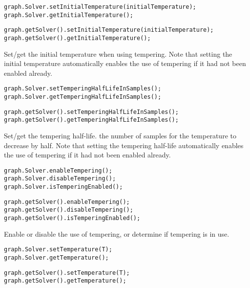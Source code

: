 \ifmatlab
\begin{lstlisting}
graph.Solver.setInitialTemperature(initialTemperature);
graph.Solver.getInitialTemperature();
\end{lstlisting}
\fi

\ifjava
\begin{lstlisting}
graph.getSolver().setInitialTemperature(initialTemperature);
graph.getSolver().getInitialTemperature();
\end{lstlisting}
\fi

Set/get the initial temperature when using tempering. Note that setting the initial temperature automatically enables the use of tempering if it had not been enabled already.

\ifmatlab
\begin{lstlisting}
graph.Solver.setTemperingHalfLifeInSamples();
graph.Solver.getTemperingHalfLifeInSamples();
\end{lstlisting}
\fi

\ifjava
\begin{lstlisting}
graph.getSolver().setTemperingHalfLifeInSamples();
graph.getSolver().getTemperingHalfLifeInSamples();
\end{lstlisting}
\fi


Set/get the tempering half-life.  the number of samples for the temperature to decrease by half. Note that setting the tempering half-life automatically enables the use of tempering if it had not been enabled already.

\ifmatlab
\begin{lstlisting}
graph.Solver.enableTempering();
graph.Solver.disableTempering();
graph.Solver.isTemperingEnabled();
\end{lstlisting}
\fi

\ifjava
\begin{lstlisting}
graph.getSolver().enableTempering();
graph.getSolver().disableTempering();
graph.getSolver().isTemperingEnabled();
\end{lstlisting}
\fi

Enable or disable the use of tempering, or determine if tempering is in use.

\ifmatlab
\begin{lstlisting}
graph.Solver.setTemperature(T);
graph.Solver.getTemperature();
\end{lstlisting}
\fi

\ifjava
\begin{lstlisting}
graph.getSolver().setTemperature(T);
graph.getSolver().getTemperature();
\end{lstlisting}
\fi

